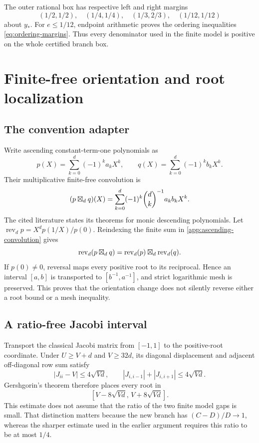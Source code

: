 The outer rational box has respective left and right margins
\[
 (1/2,1/2),\quad(1/4,1/4),\quad(1/3,2/3),\quad(1/12,1/12)
\]
about $y_*$.  For $e\le1/12$, endpoint arithmetic proves the ordering
inequalities \eqref{eq:ordering-margins}.  Thus every denominator used in
the finite model is positive on the whole certified branch box.

\section{Finite-free orientation and root localization}\label{app:finitefree-details}

\subsection{The convention adapter}

Write ascending constant-term-one polynomials as
\[
 p(X)=\sum_{k=0}^d(-1)^ka_kX^k,\qquad
 q(X)=\sum_{k=0}^d(-1)^kb_kX^k.
\]
Their multiplicative finite-free convolution is
\begin{equation}\label{app:ascending-convolution}
 (p\boxtimes_d q)(X)=
 \sum_{k=0}^d(-1)^k\binom dk^{-1}a_kb_kX^k.
\end{equation}
The cited literature states its theorems for monic descending polynomials.
Let $\operatorname{rev}_d p=X^dp(1/X)/p(0)$.  Reindexing the finite sum in
\eqref{app:ascending-convolution} gives
\[
 \operatorname{rev}_d(p\boxtimes_d q)
 =\operatorname{rev}_d(p)\boxtimes_d\operatorname{rev}_d(q).
\]
If $p(0)\ne0$, reversal maps every positive root to its reciprocal.  Hence
an interval $[a,b]$ is transported to $[b^{-1},a^{-1}]$, and strict
logarithmic mesh is preserved.  This proves that the orientation change
does not silently reverse either a root bound or a mesh inequality.

\subsection{A ratio-free Jacobi interval}

Transport the classical Jacobi matrix from $[-1,1]$ to the positive-root
coordinate.  Under $U\ge V+d$ and $V\ge32d$, its diagonal displacement and
adjacent off-diagonal row sum satisfy
\[
 |J_{ii}-V|\le4\sqrt{Vd},\qquad
 |J_{i,i-1}|+|J_{i,i+1}|\le4\sqrt{Vd}.
\]
Gershgorin's theorem therefore places every root in
\begin{equation}\label{app:jacobi-eight}
 [V-8\sqrt{Vd},\,V+8\sqrt{Vd}].
\end{equation}
This estimate does not assume that the ratio of the two finite model gaps is
small.  That distinction matters because the new branch has
$(C-D)/D\to1$, whereas the sharper estimate used in the earlier argument
requires this ratio to be at most $1/4$.

